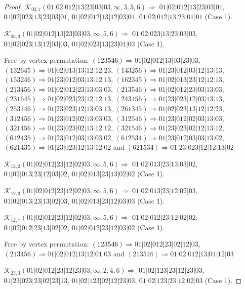 \documentclass[12pt]{article}
\theoremstyle{plain}
\theoremstyle{definition}
\theoremstyle{remark}
\newcommand{\fancy}[1]{\mathcal{#1}}
\def\K{\fancy{K}}
\begin{document}
\begin{proof}
	
	
	\bigskip
	
	$\K_{03,7}(01|02|012|13|23|03|03,\infty,3, 5, 6)\Rightarrow $ $01|02|012|13|23|03|01$, $01|02|023|13|23|03|01$, $01|02|012|13|12|03|01$, $01|02|012|13|23|01|01$ (Case 1).
	
	$\K_{03,3}(01|02|012|13|23|03|03,\infty,5, 6)\Rightarrow $ $01|02|023|13|23|03|03$, $01|02|023|13|12|03|03$, $01|02|023|13|23|01|03$ (Case 1).
	
	
	
	Free by vertex permutation: $(1 2 3 5 4 6)\Rightarrow 01|02|012|13|03|23|03$, $(1 3 2 6 4 5)\Rightarrow 01|02|013|13|12|12|23$, $(1 4 3 2 5 6)\Rightarrow 01|23|012|03|12|13|13$, $(1 5 3 2 4 6)\Rightarrow 01|23|012|03|13|12|13$, $(1 6 2 3 4 5)\Rightarrow 01|02|013|23|12|12|13$, $(2 1 3 4 5 6)\Rightarrow 01|02|012|23|13|03|03$, $(2 1 3 5 4 6)\Rightarrow 01|02|012|23|03|13|03$, $(2 3 1 6 4 5)\Rightarrow 01|02|023|23|12|12|13$, $(2 4 3 1 5 6)\Rightarrow 01|23|023|12|03|13|13$, $(2 5 3 1 4 6)\Rightarrow 01|23|023|12|13|03|13$, $(2 6 1 3 4 5)\Rightarrow 01|02|023|13|12|12|23$, $(3 1 2 4 5 6)\Rightarrow 01|23|012|02|13|03|03$, $(3 1 2 5 4 6)\Rightarrow 01|23|012|02|03|13|03$, $(3 2 1 4 5 6)\Rightarrow 01|23|023|02|13|12|12$, $(3 2 1 5 4 6)\Rightarrow 01|23|023|02|12|13|12$, $(6 1 2 4 3 5)\Rightarrow 01|23|012|03|13|03|02$, $(6 1 2 5 3 4)\Rightarrow 01|23|012|03|03|13|02$, $(6 2 1 4 3 5)\Rightarrow 01|23|023|12|13|12|02$ and $(6 2 1 5 3 4)\Rightarrow 01|23|023|12|12|13|02$
	
	
	
	\bigskip
	
	$\K_{12,2}(01|02|012|23|12|02|03,\infty,5, 6)\Rightarrow $ $01|02|013|23|13|03|02$, $01|02|013|23|12|03|02$, $01|02|013|23|13|02|02$ (Case 1).
	
	$\K_{12,3}(01|02|012|23|12|02|03,\infty,5, 6)\Rightarrow $ $01|02|013|23|12|02|03$, $01|02|013|23|13|02|03$, $01|02|013|23|12|03|03$ (Case 1).
	
	$\K_{12,7}(01|02|012|23|12|02|03,\infty,5, 6)\Rightarrow $ $01|02|012|23|12|02|02$, $01|02|012|23|13|02|02$, $01|02|012|23|12|03|02$ (Case 1).
	
	
	
	Free by vertex permutation: $(1 2 3 5 4 6)\Rightarrow 01|02|012|23|02|12|03$, $(2 1 3 4 5 6)\Rightarrow 01|02|012|13|12|01|03$ and $(2 1 3 5 4 6)\Rightarrow 01|02|012|13|01|12|03$
	
	
	
	\bigskip
	
	$\K_{23,3}(01|02|012|23|12|23|03,\infty,2, 4, 6)\Rightarrow $ $01|02|123|23|12|23|03$, $01|23|023|23|02|23|13$, $01|02|123|02|12|23|03$, $01|02|123|23|12|02|03$ (Case 1).
	

\end{proof}
\end{document}
